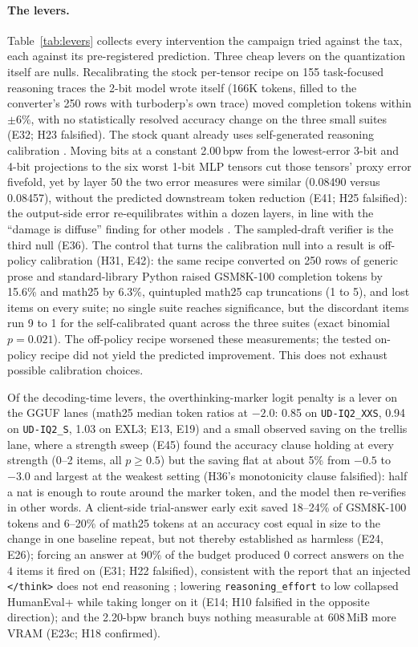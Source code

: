 \documentclass[11pt]{article}
\newcommand{\q}[1]{\texttt{#1}}
\begin{document}
\paragraph{The levers.}
Table~\ref{tab:levers} collects every intervention the campaign tried against
the tax, each against its pre-registered prediction. Three cheap levers on
the quantization itself are nulls. Recalibrating the stock per-tensor recipe
on 155 task-focused reasoning traces the 2-bit model wrote itself (166K
tokens, filled to the converter's 250 rows with turboderp's own trace) moved
completion tokens within $\pm6\%$, with no statistically resolved accuracy
change on the three small suites (E32; H23 falsified). The stock quant
already uses self-generated reasoning calibration
\citep{williams2024selfcal,wang2026ayot}. Moving bits at a constant
2.00\,bpw from the lowest-error 3-bit and 4-bit projections to the six worst
1-bit MLP tensors cut those tensors' proxy error fivefold, yet by layer 50
the two error measures were similar (0.08490 versus 0.08457), without the
predicted downstream token reduction (E41; H25 falsified): the output-side error re-equilibrates
within a dozen layers, in line with the ``damage is diffuse'' finding for
other models \citep{hu2026damage}. The sampled-draft verifier is the third
null (E36). The control that turns the calibration null into a result is
off-policy calibration (H31, E42): the same recipe converted on 250 rows of
generic prose and standard-library Python raised GSM8K-100 completion tokens
by 15.6\% and math25 by 6.3\%, quintupled math25 cap truncations (1 to 5),
and lost items on every suite; no single suite reaches significance, but
the discordant items run 9 to 1 for the self-calibrated quant across the
three suites (exact binomial $p=0.021$). The off-policy recipe worsened these measurements; the tested on-policy
recipe did not yield the predicted improvement. This does not exhaust
possible calibration choices.

Of the decoding-time levers, the overthinking-marker logit penalty
\citep{lotfi2026longer} is a lever on the GGUF lanes (math25 median token
ratios at $-2.0$: 0.85 on \q{UD-IQ2\_XXS}, 0.94 on \q{UD-IQ2\_S}, 1.03 on EXL3;
E13, E19) and a small observed saving on the trellis lane, where a strength sweep
(E45) found the accuracy clause holding at every strength (0--2 items, all
$p\ge0.5$) but the saving flat at about 5\% from $-0.5$ to $-3.0$ and largest
at the weakest setting (H36's monotonicity clause falsified): half a nat is
enough to route around the marker token, and the model then re-verifies in
other words. A client-side trial-answer early exit \citep{yang2025deer} saved
18--24\% of GSM8K-100 tokens and 6--20\% of math25 tokens at an accuracy cost
equal in size to the change in one baseline repeat, but not thereby
established as harmless (E24, E26); forcing an
answer at 90\% of the budget produced 0 correct answers on the 4 items it
fired on (E31; H22 falsified), consistent with the report that an injected
\q{</think>} does not end reasoning \citep{koh2026think}; lowering
\q{reasoning\_effort} to low collapsed HumanEval+ while taking longer on it
(E14; H10 falsified in the opposite direction); and the 2.20-bpw branch buys
nothing measurable at 608\,MiB more VRAM (E23c; H18 confirmed).
\end{document}
